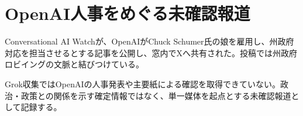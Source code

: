 \section{OpenAI人事をめぐる未確認報道}
Conversational AI Watchが、OpenAIがChuck Schumer氏の娘を雇用し、州政府対応を担当させるとする記事を公開し、窓内でXへ共有された。投稿では州政府ロビイングの文脈と結びつけている。

Grok収集ではOpenAIの人事発表や主要紙による確認を取得できていない。政治・政策との関係を示す確定情報ではなく、単一媒体を起点とする未確認報道として記録する。
